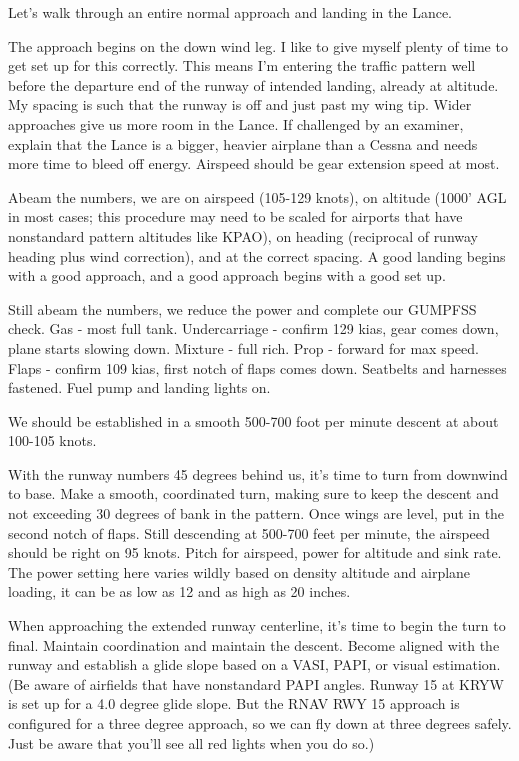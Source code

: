Let's walk through an entire normal approach and landing in the Lance.

The approach begins on the down wind leg. I like to give myself plenty of time to get set up for this correctly. This means I'm entering the traffic pattern well before the departure end of the runway of intended landing, already at altitude. My spacing is such that the runway is off and just past my wing tip. Wider approaches give us more room in the Lance. If challenged by an examiner, explain that the Lance is a bigger, heavier airplane than a Cessna and needs more time to bleed off energy. Airspeed should be gear extension speed at most.

Abeam the numbers, we are on airspeed (105-129 knots), on altitude (1000' AGL in most cases; this procedure may need to be scaled for airports that have nonstandard pattern altitudes like KPAO), on heading (reciprocal of runway heading plus wind correction), and at the correct spacing. A good landing begins with a good approach, and a good approach begins with a good set up.

Still abeam the numbers, we reduce the power and complete our GUMPFSS check. Gas - most full tank. Undercarriage - confirm 129 kias, gear comes down, plane starts slowing down. Mixture - full rich. Prop - forward for max speed. Flaps - confirm 109 kias, first notch of flaps comes down. Seatbelts and harnesses fastened. Fuel pump and landing lights on.

We should be established in a smooth 500-700 foot per minute descent at about 100-105 knots.

With the runway numbers 45 degrees behind us, it's time to turn from downwind to base. Make a smooth, coordinated turn, making sure to keep the descent and not exceeding 30 degrees of bank in the pattern. Once wings are level, put in the second notch of flaps. Still descending at 500-700 feet per minute, the airspeed should be right on 95 knots. Pitch for airspeed, power for altitude and sink rate. The power setting here varies wildly based on density altitude and airplane loading, it can be as low as 12 and as high as 20 inches.

When approaching the extended runway centerline, it's time to begin the turn to final. Maintain coordination and maintain the descent. Become aligned with the runway and establish a glide slope based on a VASI, PAPI, or visual estimation. (Be aware of airfields that have nonstandard PAPI angles. Runway 15 at KRYW is set up for a 4.0 degree glide slope. But the RNAV RWY 15 approach is configured for a three degree approach, so we can fly down at three degrees safely. Just be aware that you'll see all red lights when you do so.)

